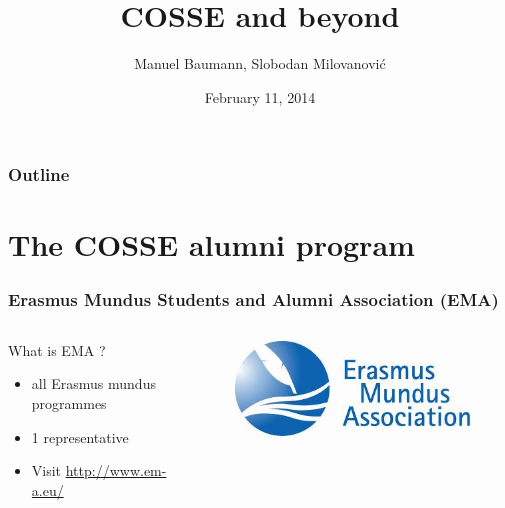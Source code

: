 \documentclass{beamer}
\title{\huge{COSSE and beyond}}
\author{Manuel Baumann, Slobodan Milovanovi\'{c}}
\date{\footnotesize{February 11, 2014}}
\begin{document}
\frame{\titlepage}
\begin{frame}
\frametitle{Outline}
\tableofcontents
\end{frame}


\section{The COSSE alumni program}
\begin{frame}
\frametitle{Erasmus Mundus Students and Alumni Association (EMA)}
\begin{columns}
\begin{column}{0.65\textwidth}
What is EMA ?
\begin{itemize}
 \item all Erasmus mundus programmes
 \item 1 representative
 \item Visit \href{http://www.em-a.eu/}{http://www.em-a.eu/} 
\end{itemize}
\end{column}
\begin{column}{0.35\textwidth}
\begin{figure}
\centering
\includegraphics[scale=0.3]{images/ema.jpeg}
\end{figure}
\end{column}
\end{columns}
\end{frame}
\end{document}
